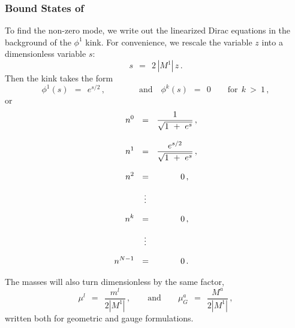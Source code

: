 \documentclass[epsfig,12pt]{article}
\def\beq{\begin{equation}}
\def\eeq{\end{equation}}
\def\beq{\begin{equation}}
\def\eeq{\end{equation}}
\begin{document}
\subsubsection[Bound States of $\psi^k$]
	{Bound States of }
\label{bound}



	To find the non-zero mode, we write out the linearized Dirac equations in the background
	of the $ \phi^1 $ kink.
	For convenience, we rescale the variable $ z $ into a dimensionless variable $ s $:
\beq
	s ~~=~~ 2\, |M^1|\, z\,.
\eeq
	Then the kink takes the form
\beq
	\phi^1(s) ~~=~~ e^{s/2}\,,\qquad\qquad\text{and}\quad \phi^k(s) ~~=~~ 0 \qquad \text{for}~~ k ~>~ 1\,,
\eeq
	or
\begin{align}
%
\notag
	n^0  & ~~=~~ \frac {             1              }
                           {    \sqrt{ 1 ~+~ e^s }      }\,, \\[3mm]
%
\notag
	n^1  & ~~=~~ \frac {          e^{s/2}           }
                           {    \sqrt{ 1 ~+~ e^s }      }\,, \\[3mm]
%
\notag
	n^2  & ~~=~~ \qquad~~\, 0\,,  \\[2mm]
%	 
 	     & ~~~\,\vdots          \\[2mm]
%
\notag
	n^k  & ~~=~~ \qquad~~\, 0\,,  \\[2mm]
%	 
\notag
 	     & ~~~\,\vdots          \\[2mm]
%
\notag
	n^{N-1} & ~~=~~ \qquad~~\, 0\,.                
\end{align}

	The masses will also turn dimensionless by the same factor,
\beq
	\mu^l  ~~=~~ \frac{ m^l }
                        {2 |M^1|}\,,
	 \qquad
	 \text{and}
	 \qquad
	 \mu_G^a ~~=~~ \frac{ M^a }
                           {2 |M^1|}\,,
\eeq
	written both for geometric and gauge formulations.
\end{document}
